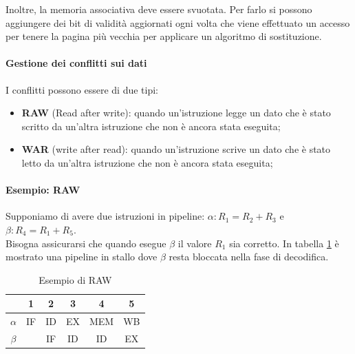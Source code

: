 \documentclass{article}
\begin{document}

Inoltre, la memoria associativa deve essere svuotata. Per farlo si possono 
aggiungere  dei bit di validità aggiornati ogni volta che viene effettuato
un accesso per tenere la pagina più vecchia per applicare un algoritmo di
sostituzione.

\paragraph{Gestione dei conflitti sui dati}
I conflitti possono essere di due tipi:
\begin{itemize}
  \item \textbf{RAW} (Read after write): quando un'istruzione legge un dato
    che è stato scritto da 
    un'altra istruzione che non è ancora stata eseguita;
  \item \textbf{WAR} (write after read): quando un'istruzione scrive un dato
    che è stato letto da un'altra istruzione che non è ancora stata eseguita;
\end{itemize}

\paragraph{Esempio: RAW}
Supponiamo di avere due istruzioni in pipeline:
$\alpha: R_1 = R_2 + R_3$ e $\beta: R_4 = R_1 + R_5$.\\
Bisogna assicurarsi che quando esegue $\beta$ il valore $R_1$ sia corretto. In 
tabella \ref{tab:RAW} è mostrato una pipeline in stallo dove $\beta$
resta bloccata nella fase di decodifica.\\
\begin{table}
  \center
  \begin{tabular}{|c|c|c|c|c|c|}
    \hline
    & 1 & 2 & 3 & 4 & 5\\
    \hline
    $\alpha$ & IF & ID & EX & MEM & WB \\
    \hline
    $\beta$ & & IF & ID & ID & EX \\
    \hline
  \end{tabular}
  \caption{Esempio di RAW}
  \label{tab:RAW}
\end{table}
\end{document}
